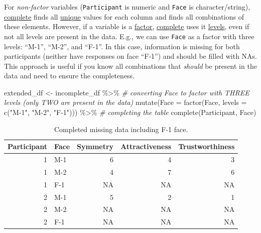 \documentclass[
]{book}
\newenvironment{Shaded}{\begin{snugshade}}{\end{snugshade}}
\newcommand{\AttributeTok}[1]{\textcolor[rgb]{0.77,0.63,0.00}{#1}}
\newcommand{\CommentTok}[1]{\textcolor[rgb]{0.56,0.35,0.01}{\textit{#1}}}
\newcommand{\FunctionTok}[1]{\textcolor[rgb]{0.00,0.00,0.00}{#1}}
\newcommand{\NormalTok}[1]{#1}
\newcommand{\OtherTok}[1]{\textcolor[rgb]{0.56,0.35,0.01}{#1}}
\newcommand{\SpecialCharTok}[1]{\textcolor[rgb]{0.00,0.00,0.00}{#1}}
\newcommand{\StringTok}[1]{\textcolor[rgb]{0.31,0.60,0.02}{#1}}
\begin{document}
For \emph{non-factor} variables (\texttt{Participant} is numeric and \texttt{Face} is character/string), \href{https://tidyr.tidyverse.org/reference/complete.html}{complete} finds all \href{https://stat.ethz.ch/R-manual/R-devel/library/base/html/unique.html}{unique} values for each column and finds all combinations of these elements. However, if a variable is a \protect\hyperlink{factors}{factor}, \href{https://tidyr.tidyverse.org/reference/complete.html}{complete} uses it \href{https://stat.ethz.ch/R-manual/R-devel/library/base/html/levels.html}{levels}, even if not all levels are present in the data. E.g., we can use \texttt{Face} as a factor with three levels: ``M-1'', ``M-2'', and ``F-1''. In this case, information is missing for both participants (neither have responses on face ``F-1'') and should be filled with NAs. This approach is useful if you know all combinations that \emph{should} be present in the data and need to ensure the completeness.

\begin{Shaded}
\begin{Highlighting}[]
\NormalTok{extended\_df }\OtherTok{\textless{}{-}}
\NormalTok{  incomplete\_df }\SpecialCharTok{\%\textgreater{}\%}
  \CommentTok{\# converting Face to factor with THREE levels (only TWO are present in the data)}
  \FunctionTok{mutate}\NormalTok{(}\AttributeTok{Face =} \FunctionTok{factor}\NormalTok{(Face, }\AttributeTok{levels =} \FunctionTok{c}\NormalTok{(}\StringTok{"M{-}1"}\NormalTok{, }\StringTok{"M{-}2"}\NormalTok{, }\StringTok{"F{-}1"}\NormalTok{))) }\SpecialCharTok{\%\textgreater{}\%}
  \CommentTok{\# completing the table}
  \FunctionTok{complete}\NormalTok{(Participant, Face)}
\end{Highlighting}
\end{Shaded}

\begin{table}

\caption{\label{tab:unnamed-chunk-278}Completed missing data including F-1 face.}
\centering
\begin{tabular}[t]{r|l|r|r|r}
\hline
Participant & Face & Symmetry & Attractiveness & Trustworthiness\\
\hline
1 & M-1 & 6 & 4 & 3\\
\hline
1 & M-2 & 4 & 7 & 6\\
\hline
1 & F-1 & NA & NA & NA\\
\hline
2 & M-1 & 5 & 2 & 1\\
\hline
2 & M-2 & NA & NA & NA\\
\hline
2 & F-1 & NA & NA & NA\\
\hline
\end{tabular}
\end{table}
\end{document}
